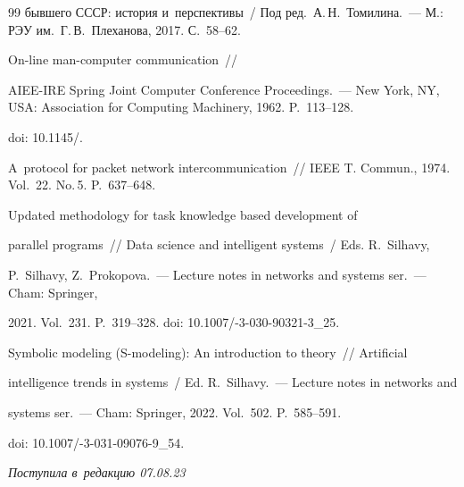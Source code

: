 {{\begin{thebibliography}{99}
быв\-ше\-го \mbox{СССР}: история и~перспективы~/ Под ред.\ А.\,Н.~Томилина.~--- М.: РЭУ им.\ Г.\,В.~Плеханова, 2017. С.~58--62.




   On-line man-computer communication~/\!\!/  


AIEE-IRE Spring Joint Computer Conference Proceedings.~--- New York, NY, USA: Association for Computing Machinery, 1962. P.~113--128. 


doi: 10.1145\!/. 




   A~protocol for packet network intercommunication~/\!\!/ IEEE T. Commun., 1974. Vol.~22. No.\,5. P.~637--648.




   Updated methodology for task knowledge based development of 


parallel programs~/\!\!/ Data science and intelligent systems~/ Eds. R.~Silhavy, 


P.~Silhavy, Z.~Prokopova.~--- Lecture notes in networks and systems ser.~--- Cham: Springer, 


2021.  Vol.~231. P.~319--328.  doi: 10.1007\!/-3-030-90321-3\_25.




   Symbolic modeling (S-modeling): An introduction to theory~/\!\!/ Artificial 


intelligence trends in systems~/ Ed. R.~Silhavy.~--- Lecture notes in networks and 


systems ser.~---  Cham: Springer, 2022.  Vol.~502. P.~585--591. 


doi:  10.1007\!/-3-031-09076-9\_54.


   \end{thebibliography}


} }











\vspace*{-6pt}





\hfill{\small\textit{Поступила в~редакцию 07.08.23}}





